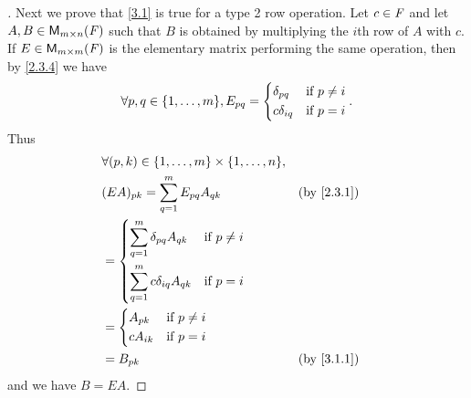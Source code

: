 \begin{proof}[]
  Next we prove that \cref{3.1} is true for a type 2 row operation.
  Let \(c \in \mathit{F}\) and let \(A, B \in \mathsf{M}_{{m} \times n}({\mathit{F}})\) such that \(B\) is obtained by multiplying the \(i\)th row of \(A\) with \(c\).
  If \(E \in \mathsf{M}_{{m} \times m}({\mathit{F}})\) is the elementary matrix performing the same operation, then by \cref{2.3.4} we have
  \[
    \forall p, q \in \set{1, \dots, m}, E_{p q} = \begin{dcases}
      \delta_{p q}   & \text{if } p \neq i \\
      c \delta_{i q} & \text{if } p = i
    \end{dcases}.
  \]
  Thus
  \begin{align*}
     & \forall (p, k) \in \set{1, \dots, m} \times \set{1, \dots, n},                               \\
     & (EA)_{p k} = \sum_{q = 1}^m E_{p q} A_{q k}                    &  & \text{(by \cref{2.3.1})} \\
     & = \begin{dcases}
           \sum_{q = 1}^m \delta_{p q} A_{q k}   & \text{if } p \neq i \\
           \sum_{q = 1}^m c \delta_{i q} A_{q k} & \text{if } p = i
         \end{dcases}                                \\
     & = \begin{dcases}
           A_{p k}   & \text{if } p \neq i \\
           c A_{i k} & \text{if } p = i
         \end{dcases}                                                            \\
     & = B_{p k}                                                      &  & \text{(by \cref{3.1.1})}
  \end{align*}
  and we have \(B = EA\).


\end{proof}
